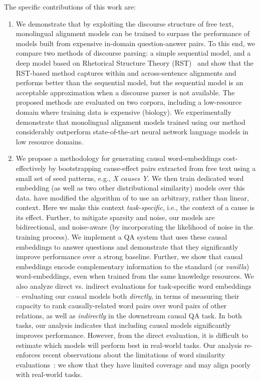 The specific contributions of this work are:

\begin{enumerate}

\item We demonstrate that by exploiting the discourse structure of free text, monolingual alignment models can be trained to surpass the performance of models built from expensive in-domain question-answer pairs.  To this end, we compare two methods of discourse parsing: a simple sequential model, and a deep model based on Rhetorical Structure Theory (RST)~\citep{mann88} and show that the RST-based method captures within and across-sentence alignments and performs better than the sequential model, but the sequential model is an acceptable approximation when a discourse parser is not available.  The proposed methods are evaluated on two corpora, including a low-resource domain where training data is expensive (biology). We experimentally demonstrate that monolingual alignment models trained using our method considerably outperform state-of-the-art neural network language models in low resource domains.

\item We propose a methodology for generating causal word-embeddings cost-effectively by bootstrapping cause-effect pairs extracted from free text using a small set of seed patterns, e.g., {\em X causes Y}. 
We then train dedicated word embedding (as well as two other distributional similarity) models over this data. \citet{levy2014dependency} have modified the algorithm of\citet{mikolov2013distributed} to use an arbitrary, rather than linear, context. Here we make this context \emph{task-specific}, i.e., the context of a cause is its effect.
Further, to mitigate sparsity and noise, our models are bidirectional, and noise-aware (by incorporating the likelihood of noise in the training process). 
We implement a QA system that uses these causal embeddings to answer questions and demonstrate that they significantly improve performance over a strong baseline. Further, we show that causal embeddings encode complementary information to the standard (or \emph{vanilla}) word-embeddings, even when trained from the same knowledge resources. 
We also analyze direct vs. indirect evaluations for task-specific word embeddings -- evaluating our causal models both  {\em directly}, in terms of measuring their capacity to rank causally-related word pairs over word pairs of other relations, as well as {\em indirectly} in the downstream causal QA task. 
In both tasks, our analysis indicates that including causal models significantly improves performance. 
However, from the direct evaluation, it is difficult to estimate which models will perform best in real-world tasks. Our analysis re-enforces recent observations about the limitations of word similarity evaluations~\citep{faruqui2016problems}: we show that they have limited coverage and may align poorly with real-world tasks.


\end{enumerate}
